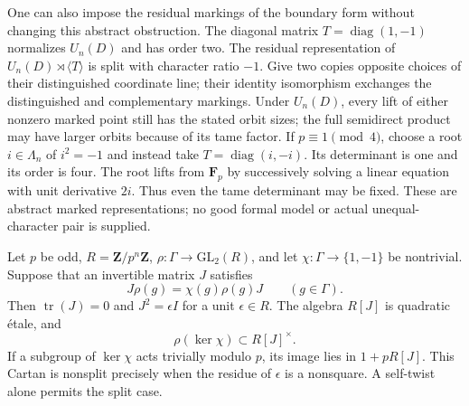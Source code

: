 One can also impose the residual markings of the boundary form
without changing this abstract obstruction. The diagonal matrix
$T=\operatorname{diag}(1,-1)$ normalizes $U_n(D)$ and has order two.
The residual representation of
$U_n(D)\rtimes\langle T\rangle$ is split with character ratio $-1$.
Give two copies opposite choices of their distinguished coordinate
line; their identity isomorphism exchanges the distinguished and
complementary markings. Under $U_n(D)$, every lift of either nonzero marked point
still has the stated orbit sizes; the full semidirect product may
have larger orbits because of its tame factor. If $p\equiv1\pmod4$, choose a
root $i\in \Lambda_n$ of $i^2=-1$ and instead take
$T=\operatorname{diag}(i,-i)$. Its determinant is one and its order
is four. The root lifts from $\mathbf F_p$ by successively solving
a linear equation with unit derivative $2i$. Thus even the tame
determinant may be fixed. These are abstract marked representations;
no good formal model or actual unequal-character pair is supplied.

\begin{lemma}
\label{lem:quadratic-self-twist-cartan}
Let $p$ be odd, $R=\mathbf Z/p^n\mathbf Z$,
$\rho:\Gamma\to\mathrm{GL}_2(R)$, and let
$\chi:\Gamma\to\{1,-1\}$ be nontrivial. Suppose that an invertible
matrix $J$ satisfies
\[
              J\rho(g)=\chi(g)\rho(g)J\qquad(g\in\Gamma).
\]
Then $\operatorname{tr}(J)=0$ and $J^2=\epsilon I$ for a unit
$\epsilon\in R$. The algebra $R[J]$ is quadratic \'etale, and
\[
                   \rho(\ker\chi)\subset R[J]^\times.
\]
If a subgroup of $\ker\chi$ acts trivially modulo $p$, its image
lies in $1+pR[J]$. This Cartan is nonsplit precisely when the
residue of $\epsilon$ is a nonsquare. A self-twist alone permits
the split case.
\end{lemma}

